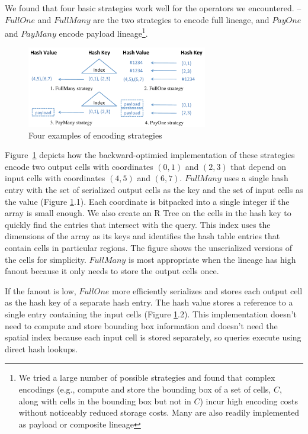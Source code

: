 We found that four basic strategies work well for the operators we encountered.
-- $FullOne$ and $FullMany$ are the two strategies to encode full lineage, and
$PayOne$ and $PayMany$ encode payload lineage\footnote{We tried a large number
    of possible strategies and found that complex encodings (e.g., compute and
    store the bounding box of a set of cells, $C$, along with cells in the
bounding box but not in $C$) incur high encoding costs without noticeably
reduced storage costs.  Many are also readily implemented as payload or
composite lineage}.

\begin{figure}[h!]
\begin{center}
   \includegraphics[width=3.1in,natwidth=8.66in,natheight=3.89in]{figures/pointer.pdf}
\caption{ Four examples of encoding strategies }
\label{f:pointer}
\end{center}
\end{figure}

Figure~\ref{f:pointer} depicts how the backward-optimied implementation of
these strategies encode two output cells with coordinates $(0,1)$ and $(2,3)$
that depend on input cells with coordinates $(4,5)$ and $(6,7)$. $FullMany$
uses a single  hash entry with the set of serialized output cells as the key
and the set of input cells as the value (Figure \ref{f:pointer}.1).  Each
coordinate is  bitpacked into a single integer if the array is small enough. We
also create an R\* Tree on the cells in the hash key to quickly find the
entries that intersect with the query. This index uses the dimensions of the
array as its keys and identifies the hash table entries that contain cells in
particular regions.  The figure shows the unserialized versions of the cells
for simplicity.  $FullMany$ is most appropriate when the lineage has high
fanout because it only needs to store the output cells once.

If the fanout is low, $FullOne$ more efficiently serializes and stores each
output cell as the hash key of a separate hash entry.  The hash value stores a reference
to a single entry containing the input cells (Figure \ref{f:pointer}.2).  This implementation doesn't need to
compute and store bounding box information 
and doesn't need the spatial index because each input cell is
stored separately, so queries execute using direct hash lookups.

